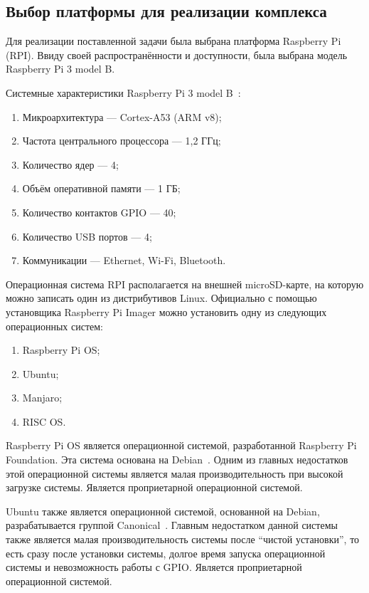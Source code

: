 \subsection{Выбор платформы для реализации комплекса}

Для реализации поставленной задачи была выбрана платформа Raspberry Pi (RPI). Ввиду своей распространённости и доступности, была выбрана модель Raspberry Pi 3 model B. 

Системные характеристики Raspberry Pi 3 model B~\cite{rpi-site}:

\begin{enumerate}
  \item Микроархитектура --- Cortex-A53 (ARM v8);
  \item Частота центрального процессора --- 1,2 ГГц;
  \item Количество ядер --- 4;
  \item Объём оперативной памяти --- 1 ГБ;
  \item Количество контактов GPIO --- 40;
  \item Количество USB портов --- 4;
  \item Коммуникации --- Ethernet, Wi-Fi, Bluetooth.
\end{enumerate}

Операционная система RPI располагается на внешней microSD-карте, на которую можно записать один из дистрибутивов Linux. Официально с помощью установщика Raspberry Pi Imager можно установить одну из следующих операционных систем:

\begin{enumerate}
  \item Raspberry Pi OS;
  \item Ubuntu;
  \item Manjaro;
  \item RISC OS.
\end{enumerate}

Raspberry Pi OS является операционной системой, разработанной Raspberry Pi Foundation. Эта система основана на Debian~\cite{rpi-site}. Одним из главных недостатков этой операционной системы является малая производительность при высокой загрузке системы. Является проприетарной операционной системой.

Ubuntu также является операционной системой, основанной на Debian, разрабатывается группой Canonical~\cite{ubuntu}. Главным недостатком данной системы также является малая производительность системы после ``чистой установки'', то есть сразу после установки системы,  долгое время запуска операционной системы и невозможность работы с GPIO. Является проприетарной операционной системой.

